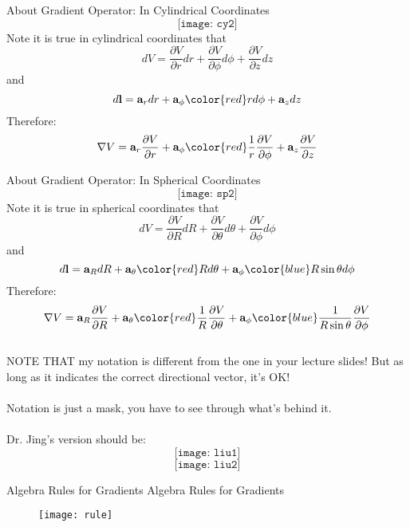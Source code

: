 \documentclass[10pt]{beamer}
\begin{document}
\begin{frame}[allowframebreaks]{About Gradient Operator: In Cylindrical Coordinates}
$$\texttt{[image: cy2]}$$
Note it is true {\color{red} in cylindrical coordinates} that
$$dV = \dfrac{\partial V}{\partial r}dr + \dfrac{\partial V}{\partial \phi}d\phi + \dfrac{\partial V}{\partial z}dz$$
and 
$$d\mathbf{l} = \mathbf{a}_rdr + \mathbf{a}_\phi {\color{red}r} d\phi + \mathbf{a}_z dz$$
Therefore:
$$\nabla V =\mathbf{a}_r\dfrac{\partial V}{\partial r} + \mathbf{a}_\phi{\color{red}\dfrac{1}{r}}\dfrac{\partial V}{\partial \phi} + \mathbf{a}_z \dfrac{\partial V}{\partial z}$$

\end{frame}


\begin{frame}[allowframebreaks]{About Gradient Operator: In Spherical Coordinates}
	$$\texttt{[image: sp2]}$$
	Note it is true {\color{red} in spherical coordinates} that
	$$dV = \dfrac{\partial V}{\partial R}dR + \dfrac{\partial V}{\partial \theta}d\theta + \dfrac{\partial V}{\partial \phi}d\phi$$
	and 
	$$d\mathbf{l} = \mathbf{a}_RdR + \mathbf{a}_\theta {\color{red}R} d\theta + \mathbf{a}_\phi {\color{blue}R\sin\theta} d\phi$$
	Therefore:
	$$\nabla V =\mathbf{a}_R\dfrac{\partial V}{\partial R} + \mathbf{a}_\theta{\color{red}\dfrac{1}{R}}\dfrac{\partial V}{\partial \theta} + \mathbf{a}_\phi {\color{blue}\dfrac{1}{R\sin\theta}}\dfrac{\partial V}{\partial \phi}$$~\\
	NOTE THAT my notation is different from the one in your lecture slides! But as long as it indicates the correct directional vector, it's OK! \\~
	\\{\color{red}Notation is just a mask, you have to see through what's behind it}.\\~
	\\Dr. Jing's version should be:
	$$\texttt{[image: liu1]}$$
	$$\texttt{[image: liu2]}$$
\end{frame}


\begin{frame}[allowframebreaks]{ Algebra Rules for Gradients}
	Algebra Rules for Gradients
	\begin{figure}[H]
		\centering
		\texttt{[image: rule]}
	\end{figure}
\end{frame}
\end{document}
